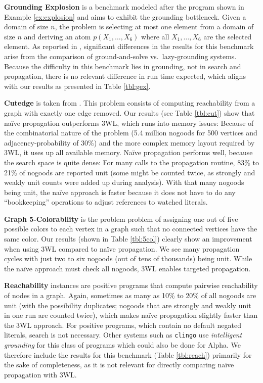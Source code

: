 \documentclass{vutinfth} %
\begin{document}
\begin{description}
\item{\bfseries Grounding Explosion} is a benchmark modeled after the program shown in Example \ref{ex:explosion} and aims to exhibit the grounding bottleneck. Given a domain of size $n$, the problem is selecting at most one element from a domain of size $n$ and deriving an atom $p(X_1, \ldots , X_6)$ where all $X_1, \ldots , X_6$ are the selected element.
As reported in \cite{alpha-techniques}, significant differences in the results for this benchmark arise from the comparison of ground-and-solve vs.~lazy-grounding systems. Because the difficulty in this benchmark lies in grounding, not in search and propagation, there is no relevant difference in run time expected, which aligns with our results as presented in Table \ref{tbl:gex}.

\item{\bfseries Cutedge} is taken from \cite[Example 1]{omiga}. This problem consists of computing reachability from a graph with exactly one edge removed.
Our results (see Table \ref{tbl:cut}) show that na\"{i}ve propagation outperforms 3WL, which runs into memory issues: Because of the combinatorial nature of the problem (5.4 million nogoods for 500 vertices and adjacency-probability of 30\%) and the more complex memory layout required by 3WL, it uses up all available memory. Na\"{i}ve propagation performs well, because the search space is quite dense: For many calls to the propagation routine, 83\% to 21\% of nogoods are reported unit (some might be counted twice, as strongly and weakly unit counts were added up during analysis). With that many nogoods being unit, the na\"{i}ve approach is faster because it does not have to do any \enquote{bookkeeping} operations to adjust references to watched literals.

\item{\bfseries Graph 5-Colorability} is the problem problem of assigning one out of five possible colors to each vertex in a graph such that no connected vertices have the same color. Our results (shown in Table \ref{tbl:5col}) clearly show an improvement when using 3WL compared to na\"{i}ve propagation. We see many propagation cycles with just two to six nogoods (out of tens of thousands) being unit. While the na\"{i}ve approach must check all nogoods, 3WL enables targeted propagation.

\item{\bfseries Reachability} instances are positive programs that compute pairwise reachability of nodes in a graph. Again, sometimes as many as 10\% to 20\% of all nogoods are unit (with the possibility duplicates; nogoods that are strongly and weakly unit in one run are counted twice), which makes na\"{i}ve propagation slightly faster than the 3WL approach.
For positive programs, which contain no default negated literals, search is not necessary. Other systems such as \texttt{clingo} use \emph{intelligent grounding} for this class of programs which could also be done for Alpha. We therefore include the results for this benchmark (Table \ref{tbl:reach}) primarily for the sake of completeness, as it is not relevant for directly comparing na\"{i}ve propagation with 3WL.
\end{description}
\end{document}

